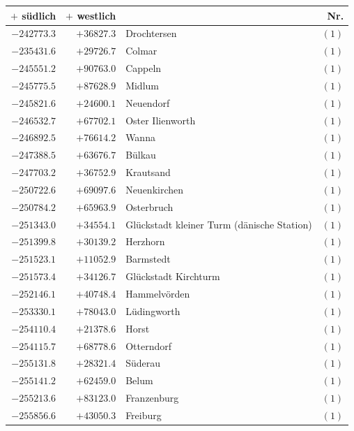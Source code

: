\clearpage{}%
\begin{center}\begingroup\fontsize{8}{9}\selectfont
\setlength{\tabcolsep}{4pt}
\begin{tabular}{r|r|p{170pt}|r}\hline
\(+\) südlich&\(+\) westlich&&Nr.\\\hline
\(-242773.3\)&\(+36827.3\)&Drochtersen&\((1)\)\\
\(-235431.6\)&\(+29726.7\)&Colmar&\((1)\)\\
\(-245551.2\)&\(+90763.0\)&Cappeln&\((1)\)\\
\(-245775.5\)&\(+87628.9\)&Midlum&\((1)\)\\
\(-245821.6\)&\(+24600.1\)&Neuendorf&\((1)\)\\
\(-246532.7\)&\(+67702.1\)&Oster Ilienworth&\((1)\)\\
\(-246892.5\)&\(+76614.2\)&Wanna&\((1)\)\\
\(-247388.5\)&\(+63676.7\)&Bülkau&\((1)\)\\
\(-247703.2\)&\(+36752.9\)&Krautsand&\((1)\)\\
\(-250722.6\)&\(+69097.6\)&Neuenkirchen&\((1)\)\\
\(-250784.2\)&\(+65963.9\)&Osterbruch&\((1)\)\\
\(-251343.0\)&\(+34554.1\)&Glückstadt kleiner Turm (dänische Station)&\((1)\)\\
\(-251399.8\)&\(+30139.2\)&Herzhorn&\((1)\)\\
\(-251523.1\)&\(+11052.9\)&Barmstedt&\((1)\)\\
\(-251573.4\)&\(+34126.7\)&Glückstadt Kirchturm&\((1)\)\\
\(-252146.1\)&\(+40748.4\)&Hammelvörden&\((1)\)\\
\(-253330.1\)&\(+78043.0\)&Lüdingworth&\((1)\)\\
\(-254110.4\)&\(+21378.6\)&Horst&\((1)\)\\
\(-254115.7\)&\(+68778.6\)&Otterndorf&\((1)\)\\
\(-255131.8\)&\(+28321.4\)&Süderau&\((1)\)\\
\(-255141.2\)&\(+62459.0\)&Belum&\((1)\)\\
\(-255213.6\)&\(+83123.0\)&Franzenburg&\((1)\)\\
\(-255856.6\)&\(+43050.3\)&Freiburg&\((1)\)\\
\hline\end{tabular}\endgroup\end{center}
\clearpage

